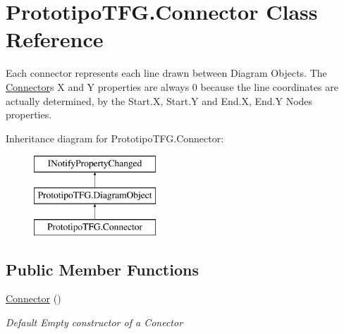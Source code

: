 \hypertarget{class_prototipo_t_f_g_1_1_connector}{}\section{Prototipo\+T\+F\+G.\+Connector Class Reference}
\label{class_prototipo_t_f_g_1_1_connector}


Each connector represents each line drawn between Diagram Objects. The \hyperlink{class_prototipo_t_f_g_1_1_connector}{Connector}\textquotesingle{}s X and Y properties are always 0 because the line coordinates are actually determined, by the Start.\+X, Start.\+Y and End.\+X, End.\+Y Nodes\textquotesingle{} properties.  


Inheritance diagram for Prototipo\+T\+F\+G.\+Connector\+:\begin{figure}[H]
\begin{center}
\leavevmode
\includegraphics[height=3.000000cm]{class_prototipo_t_f_g_1_1_connector}
\end{center}
\end{figure}
\subsection*{Public Member Functions}
\begin{DoxyCompactItemize}
\item 
\hyperlink{class_prototipo_t_f_g_1_1_connector_a51b8f8f54d3cf94eff3edd27013d155c}{Connector} ()
\begin{DoxyCompactList}\small\item\em Default Empty constructor of a Conector \end{DoxyCompactList}\end{DoxyCompactItemize}
